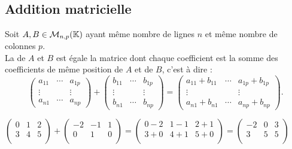 \documentclass{book}
\begin{document}
\subsection{Addition matricielle}
\begin{Definition}[Somme]
Soit $A,B\in \mathcal{M}_{n,p}(\mathbb{K})$ ayant  même nombre de lignes $n$ et
même nombre de colonnes $p$.\\
La  de $A$ et $B$ est égale la matrice dont chaque coefficient est la somme des coefficients de même position de $A$ et
de $B$, c'est à dire : 
$$\begin{pmatrix}
a_{11} & \cdots & a_{1p}\\
 \vdots &  & \vdots\\
a_{n1} & \cdots & a_{np}
\end{pmatrix}+\begin{pmatrix}
b_{11} & \cdots & b_{1p}\\
 \vdots &  & \vdots\\
b_{n1} & \cdots & b_{np}
\end{pmatrix}= \begin{pmatrix}
a_{11}+b_{11} & \cdots & a_{1p}+b_{1p}\\
 \vdots &  & \vdots\\
a_{n1}+b_{n1} & \cdots & a_{np}+b_{np}
\end{pmatrix}.$$
\end{Definition}
\begin{Exemple}$
\begin{pmatrix}
0 &1 & 2 \\
3 &4 & 5 \\
\end{pmatrix} + 
\begin{pmatrix}
-2 &-1 & 1 \\
0 & 1 & 0 \\
\end{pmatrix}
=\begin{pmatrix}
0-2 &1-1 & 2+1\\
3+0 & 4+1 & 5+0\\
\end{pmatrix}=
\begin{pmatrix}
-2 &0 & 3\\
3 & 5 & 5\\
\end{pmatrix}
$
\end{Exemple}
\end{document}
